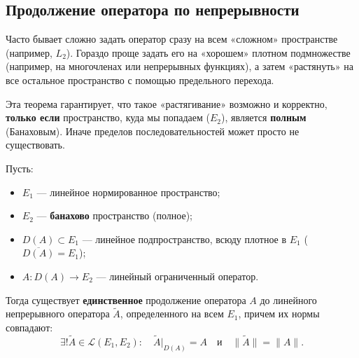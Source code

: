 
\subsection{Продолжение оператора по непрерывности}

\begin{idea}
	Часто бывает сложно задать оператор сразу на всем «сложном» пространстве (например, $L_2$). Гораздо проще задать его на «хорошем» плотном подмножестве (например, на многочленах или непрерывных функциях), а затем «растянуть» на все остальное пространство с помощью предельного перехода.
	
	Эта теорема гарантирует, что такое «растягивание» возможно и корректно, \textbf{только если} пространство, куда мы попадаем ($E_2$), является \textbf{полным} (Банаховым). Иначе пределов последовательностей может просто не существовать.
\end{idea}

\begin{theorem}\label{extrapolate-to-closure}
	Пусть:
	\begin{itemize}
		\item $E_1$ --- линейное нормированное пространство;
		\item $E_2$ --- \textbf{банахово} пространство (полное);
		\item $D(A) \subset E_1$ --- линейное подпространство, всюду плотное в $E_1$ ($\overline{D(A)} = E_1$);
		\item $A: D(A) \to E_2$ --- линейный ограниченный оператор.
	\end{itemize}
	
	Тогда существует \textbf{единственное} продолжение оператора $A$ до линейного непрерывного оператора $\widetilde{A}$, определенного на всем $E_1$, причем их нормы совпадают:
	\[ \exists! \widetilde{A} \in \mathcal{L}(E_1, E_2): \quad \widetilde{A}\big|_{D(A)} = A \quad \text{и} \quad \|\widetilde{A}\| = \|A\|. \]
\end{theorem}

